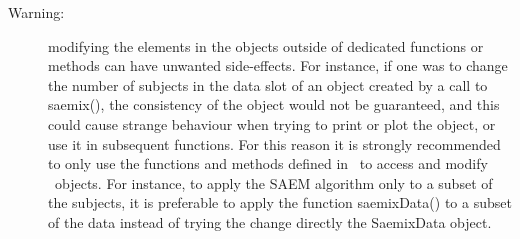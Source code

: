 \begin{description}
 \item[Warning:] modifying the elements in the objects outside of dedicated functions or methods can have unwanted side-effects. For instance, if one was to change the number of subjects in the data slot of an object created by a call to {\sf saemix()}, the consistency of the object would not be guaranteed, and this could cause strange behaviour when trying to print or plot the object, or use it in subsequent functions. For this reason it is strongly recommended to only use the functions and methods defined in \saemix~to access and modify \saemix~objects. For instance, to apply the SAEM algorithm only to a subset of the subjects, it is preferable to apply the function {\sf saemixData()} to a subset of the data instead of trying the change directly the {\sf SaemixData} object.
\end{description}

